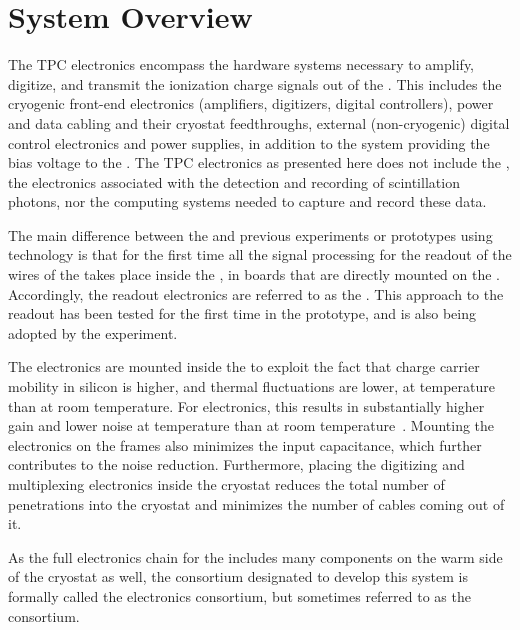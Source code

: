 \section{System Overview}
\label{sec:fdsp-tpcelec-overview}

The TPC electronics encompass the hardware systems necessary to 
amplify, digitize, and transmit the  ionization charge 
signals out of the   . This 
includes the cryogenic front-end electronics (amplifiers, digitizers, 
digital controllers), power and data cabling and their cryostat 
feedthroughs, external (non-cryogenic) digital control electronics and 
power supplies, in addition to the system providing the bias voltage
to the .  The TPC electronics as presented here does not 
include the , the electronics associated with the detection 
and recording of  scintillation photons, nor the  
computing systems needed to capture and record these data.


The main difference between the    
and previous experiments or prototypes using  technology is
that for the first time all the signal processing for the readout of the
wires of the  takes place inside the , in boards that 
are directly mounted on the . Accordingly, the  readout
electronics are referred to as the . This approach to the 
readout has been tested for the first time in the  prototype,
and is also being adopted by the  experiment.

The electronics are mounted inside the  to exploit the fact that 
charge carrier mobility in silicon is higher, and thermal fluctuations are lower,  
at  temperature than at room temperature. For  
electronics, this results in substantially higher gain and lower noise 
at  temperature than at room temperature~\cite{DeGeronimo:2011zz}.
Mounting the  electronics on the  frames also minimizes 
the input capacitance, which further contributes to the noise reduction.  
Furthermore, placing the digitizing and multiplexing electronics inside 
the cryostat reduces the total number of penetrations into the cryostat 
and minimizes the number of cables coming out of it.

As the full  electronics chain for the  includes 
many components on the warm side of the cryostat as well, the  
consortium designated to develop this system is formally called 
the    electronics consortium, but 
sometimes referred to as the  consortium.

